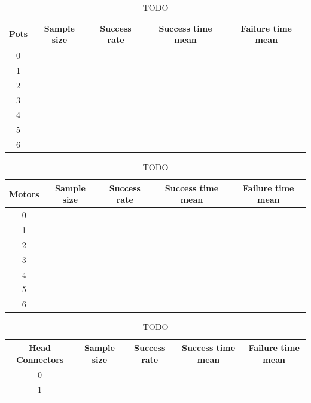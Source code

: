 \begin{table}[H]
\begin{center}
\begin{singlespace}
\begin{tabular}{| c | c | c | c | c |}
\hline
Pots & Sample size & Success rate & Success time mean & Failure time mean\\
\hline\hline
0 & & & & \\
1 & & & & \\
2 & & & & \\
3 & & & & \\
4 & & & & \\
5 & & & & \\
6 & & & & \\
\hline
\end{tabular}
\end{singlespace}
\end{center}
\label{tb:TODO}
\caption{TODO}
\end{table}

\begin{table}[H]
\begin{center}
\begin{singlespace}
\begin{tabular}{| c | c | c | c | c |}
\hline
Motors & Sample size & Success rate & Success time mean & Failure time mean\\
\hline\hline
0 & & & & \\
1 & & & & \\
2 & & & & \\
3 & & & & \\
4 & & & & \\
5 & & & & \\
6 & & & & \\
\hline
\end{tabular}
\end{singlespace}
\end{center}
\label{tb:TODO}
\caption{TODO}
\end{table}

\begin{table}[H]
\begin{center}
\begin{singlespace}
\begin{tabular}{| c | c | c | c | c |}
\hline
Head Connectors & Sample size & Success rate & Success time mean &
Failure time mean\\
\hline\hline
0 & & & & \\
1 & & & & \\
\hline
\end{tabular}
\end{singlespace}
\end{center}
\label{tb:TODO}
\caption{TODO}
\end{table}


